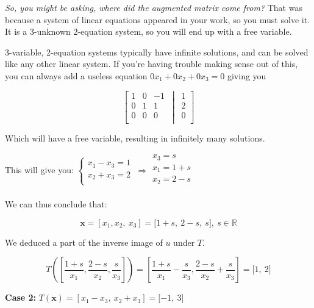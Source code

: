\documentclass[
]{article}
\begin{document}
\emph{So, you might be asking, where did the augmented matrix come
from?} That was because a system of linear equations appeared in your
work, so you must solve it. It is a 3-unknown 2-equation system, so you
will end up with a free variable.

3-variable, 2-equation systems typically have infinite solutions, and
can be solved like any other linear system. If you're having trouble
making sense out of this, you can always add a useless equation
$0x_{1} + 0x_{2} + 0x_{3} = 0$ giving you

$$\left\lbrack \begin{matrix}
1 & 0 & - 1 \\
0 & 1 & 1 \\
0 & 0 & 0 \\
\end{matrix}\, \middle| \,\begin{matrix}
1 \\
2 \\
0 \\
\end{matrix} \right\rbrack$$

Which will have a free variable, resulting in infinitely many solutions.

This will give you: $\left\{ \begin{matrix}
x_{1} - x_{3} = 1 \\
x_{2} + x_{3} = 2 \\
\end{matrix} \right.\  \Rightarrow \begin{matrix}
x_{3} = s \\
x_{1} = 1 + s \\
x_{2} = 2 - s \\
\end{matrix}$

We can thus conclude that:

$$\mathbf{x} = \left\lbrack x_{1},x_{2},\ x_{3} \right\rbrack = \lbrack 1 + s,\ 2 - s,\ s\rbrack,\ s\mathbb{\in R}$$

We deduced a part of the inverse image of $u$ under $T$.

$$T\left( \left\lbrack \frac{1 + s}{x_{1}},\frac{2 - s}{x_{2}},\frac{s}{x_{3}} \right\rbrack \right) = \left\lbrack \frac{1 + s}{x_{1}} - \frac{s}{x_{3}},\frac{2 - s}{x_{2}} + \frac{s}{x_{3}} \right\rbrack = \lbrack 1,\ 2\rbrack$$

\textbf{Case 2:}
$T\left( \mathbf{x} \right) = \left\lbrack x_{1} - x_{3},\ x_{2} + x_{3} \right\rbrack = \lbrack - 1,\ 3\rbrack$
\end{document}
